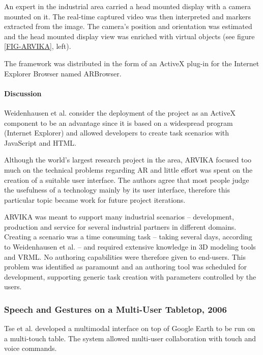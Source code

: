 An expert in the industrial area carried a head mounted display with a camera mounted on it.
The real-time captured video was then interpreted and markers extracted from the image.
The camera's position and orientation was estimated and the head mounted display view was
enriched with virtual objects (see figure \ref{FIG-ARVIKA}, left).

The framework was distributed in the form of an ActiveX plug-in for the Internet Explorer Browser
named ARBrowser.

\paragraph{Discussion}
\label{sec:Discussion}

Weidenhausen et al. \cite{ARVIKA-LESSONS} consider the deployment of the project as an ActiveX component
to be an advantage since it is based on a widespread program (Internet Explorer) and allowed developers
to create task scenarios with JavaScript and HTML.

Although the world's largest research project in the area, ARVIKA focused too
much on the technical problems regarding AR and little effort was spent on the creation of a
suitable user interface. The authors agree that most people judge the usefulness of a technology
mainly by its user interface, therefore this particular topic became work for future project iterations.

ARVIKA was meant to support many industrial scenarios -- development, production and service for several
industrial partners in different domains. Creating a scenario was a time consuming task -- taking several days,
according to Weidenhausen et al. -- and required extensive knowledge in 3D modeling tools and VRML.
No authoring capabilities were therefore given to end-users.
This problem was identified as paramount and an authoring tool was scheduled for development,
supporting generic task creation with parameters controlled by the users.



\subsubsection{Speech and Gestures on a Multi-User Tabletop, 2006}

Tse et al. \cite{SP-GEST-TTOP} developed a multimodal interface on top of Google Earth \cite{SITE-EARTH} to be run
on a multi-touch table. The system allowed multi-user collaboration with touch and voice commands.

